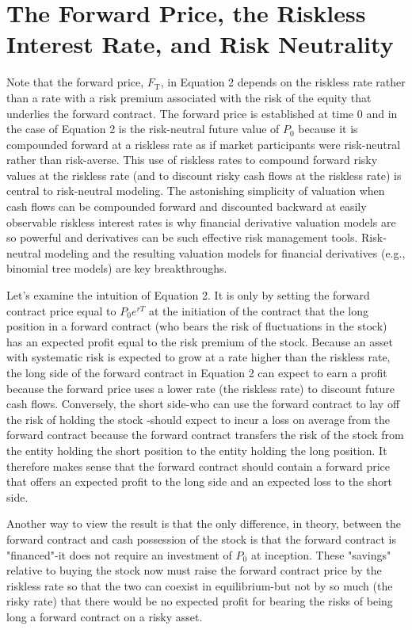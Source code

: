 \documentclass[11pt]{article}
\begin{document}
\section*{The Forward Price, the Riskless Interest Rate, and Risk Neutrality}
Note that the forward price, $F_{\mathrm{T}}$, in Equation 2 depends on the riskless rate rather than a rate with a risk premium associated with the risk of the equity that underlies the forward contract. The forward price is established at time 0 and in the case of Equation 2 is the risk-neutral future value of $P_{0}$ because it is compounded forward at a riskless rate as if market participants were risk-neutral rather than risk-averse. This use of riskless rates to compound forward risky values at the riskless rate (and to discount risky cash flows at the riskless rate) is central to risk-neutral modeling. The astonishing simplicity of valuation when cash flows can be compounded forward and discounted backward at easily observable riskless interest rates is why financial derivative valuation models are so powerful and derivatives can be such effective risk management tools. Risk-neutral modeling and the resulting valuation models for financial derivatives (e.g., binomial tree models) are key breakthroughs.

Let's examine the intuition of Equation 2. It is only by setting the forward contract price equal to $P_{0} e^{r T}$ at the initiation of the contract that the long position in a forward contract (who bears the risk of fluctuations in the stock) has an expected profit equal to the risk premium of the stock. Because an asset with systematic risk is expected to grow at a rate higher than the riskless rate, the long side of the forward contract in Equation 2 can expect to earn a profit because the forward price uses a lower rate (the riskless rate) to discount future cash flows. Conversely, the short side-who can use the forward contract to lay off the risk of holding the stock -should expect to incur a loss on average from the forward contract because the forward contract transfers the risk of the stock from the entity holding the short position to the entity holding the long position. It therefore makes sense that the forward contract should contain a forward price that offers an expected profit to the long side and an expected loss to the short side.

Another way to view the result is that the only difference, in theory, between the forward contract and cash possession of the stock is that the forward contract is "financed"-it does not require an investment of $P_{0}$ at inception. These "savings" relative to buying the stock now must raise the forward contract price by the riskless rate so that the two can coexist in equilibrium-but not by so much (the risky rate) that there would be no expected profit for bearing the risks of being long a forward contract on a risky asset.
\end{document}
